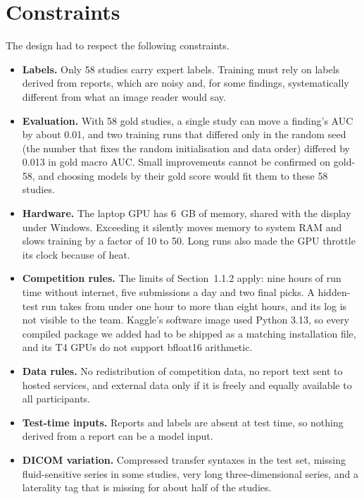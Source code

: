 \section{Constraints}

The design had to respect the following constraints.

\begin{itemize}[leftmargin=1.4em]
\item \textbf{Labels.} Only 58 studies carry expert labels. Training must rely on labels derived from reports, which are noisy and, for some findings, systematically different from what an image reader would say.
\item \textbf{Evaluation.} With 58 gold studies, a single study can move a finding's AUC by about 0.01, and two training runs that differed only in the random seed (the number that fixes the random initialisation and data order) differed by 0.013 in gold macro AUC. Small improvements cannot be confirmed on gold-58, and choosing models by their gold score would fit them to these 58 studies.
\item \textbf{Hardware.} The laptop GPU has 6~GB of memory, shared with the display under Windows. Exceeding it silently moves memory to system RAM and slows training by a factor of 10 to 50. Long runs also made the GPU throttle its clock because of heat.
\item \textbf{Competition rules.} The limits of Section~1.1.2 apply: nine hours of run time without internet, five submissions a day and two final picks. A hidden-test run takes from under one hour to more than eight hours, and its log is not visible to the team. Kaggle's software image used Python 3.13, so every compiled package we added had to be shipped as a matching installation file, and its T4 GPUs do not support bfloat16 arithmetic.
\item \textbf{Data rules.} No redistribution of competition data, no report text sent to hosted services, and external data only if it is freely and equally available to all participants.
\item \textbf{Test-time inputs.} Reports and labels are absent at test time, so nothing derived from a report can be a model input.
\item \textbf{DICOM variation.} Compressed transfer syntaxes in the test set, missing fluid-sensitive series in some studies, very long three-dimensional series, and a laterality tag that is missing for about half of the studies.
\end{itemize}

